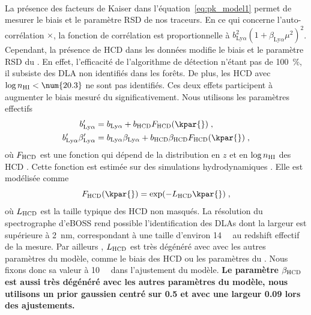 \paragraph{}
La présence des facteurs de Kaiser dans l'équation~\ref{eq:pk_model1} permet de mesurer le biais et le paramètre RSD de nos traceurs. En ce qui concerne l'auto-corrélation \lya{}$\times$\lya{}, la fonction de corrélation est proportionnelle à $b_{\mathrm{Ly}\alpha}^2(1+\beta_{\mathrm{Ly}\alpha} \mu^2)^2$. Cependant, la présence de HCD dans les données modifie le biais et le paramètre RSD du \lya{}. En effet, l'efficacité de l'algorithme de détection n'étant pas de \SI{100}{\percent}, il subsiste des DLA non identifiés dans les forêts. De plus, les HCD avec $\log n_{\textsc{HI}} < \num{20.3}$ ne sont pas identifiés. Ces deux effets participent à augmenter le biais mesuré du \lya{} significativement. Nous utilisons les paramètres effectifs
\begin{align}
  \label{eq:bias_hcd_def}
  b_{\mathrm{Ly}\alpha}' &= b_{\mathrm{Ly}\alpha} + b_{\textsc{HCD}} F_{\textsc{HCD}}(\kpar{}) \; , \\
  b_{\mathrm{Ly}\alpha}' \beta_{\mathrm{Ly}\alpha}' &= b_{\mathrm{Ly}\alpha} \beta_{\mathrm{Ly}\alpha} + b_{\textsc{HCD}} \beta_{\textsc{HCD}} F_{\textsc{HCD}}(\kpar{})  \; ,
\end{align}
où $F_{\textsc{HCD}}$ est une fonction qui dépend de la distribution en $z$ et en $\log n_{\textsc{HI}}$ des HCD \autocite{Font-Ribera2012a}. Cette fonction est estimée sur des simulations hydrodynamiques \autocite{Rogers2017}. Elle est modélisée comme
\begin{equation}
  \label{eq:f_hcd_def}
  F_{\textsc{HCD}}(\kpar{}) = \exp(- L_{\textsc{HCD}} \kpar{}) \; ,
\end{equation}
où $L_{\textsc{HCD}}$ est la taille typique des HCD non masqués. La résolution du spectrographe d'eBOSS rend possible l'identification des DLAs dont la largeur est supérieure à \SI{2}{\nano\meter}, correspondant à une taille d'environ \SI{14}{\perh\Mpc} au redshift effectif de la mesure. Par ailleurs , $L_{\textsc{HCD}}$ est très dégénéré avec avec les autres paramètres du modèle, comme le biais des HCD ou les paramètres du \lya{}. Nous fixons donc sa valeur à \SI{10}{\perh\Mpc} dans l'ajustement du modèle. \textbf{Le paramètre $\beta_{\textsc{HCD}}$ est aussi très dégénéré avec les autres paramètres du modèle, nous utilisons un prior gaussien centré sur \num{0.5} et avec une largeur \num{0.09} lors des ajustements.}

